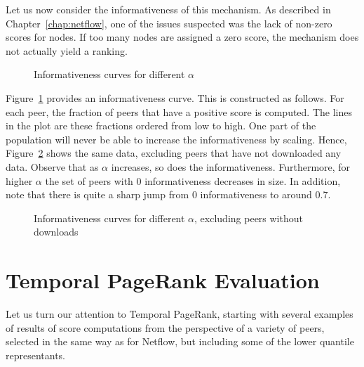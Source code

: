 \documentclass[a4paper,11pt]{book}
\theoremstyle{definition}
\begin{document}
Let us now consider the informativeness of this mechanism. As described in Chapter~\ref{chap:netflow},
one of the issues suspected was the lack of non-zero scores for nodes. If too many nodes are assigned
a zero score, the mechanism does not actually yield a ranking. 

\begin{figure}[ht]
    \centering
    
    \caption{Informativeness curves for different $\alpha$}
    \label{fig:info}
\end{figure}

Figure~\ref{fig:info} provides an informativeness curve. This is constructed as follows. For each
peer, the fraction of peers that have a positive score is computed. The lines in the plot
are these fractions ordered from low to high. One part of the population will never be able
to increase the informativeness by scaling. Hence, Figure~\ref{fig:info_filter} shows the same
data, excluding peers that have not downloaded any data. Observe that as $\alpha$ increases,
so does the informativeness. Furthermore, for higher $\alpha$ the set of peers with $0$ 
informativeness decreases in size. In addition, note that there is quite a sharp jump from 
$0$ informativeness to around $0.7$.

\begin{figure}[ht]
    \centering
    
    \caption{Informativeness curves for different $\alpha$, excluding peers without downloads}
    \label{fig:info_filter}
\end{figure}

\section{Temporal PageRank Evaluation}

Let us turn our attention to Temporal PageRank, starting with several examples of results of
score computations from the perspective of a variety of peers, selected in the same way as for
Netflow, but including some of the lower quantile representants.
\end{document}
